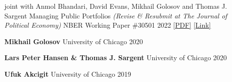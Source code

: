 


\begin{cventries}

	\cventry
	{joint with Anmol Bhandari, David Evans, Mikhail Golosov and Thomas J. Sargent} %
	{Managing Public Portfolios \textit{(Revise \& Resubmit at The Journal of Political Economy)}}  %
	{NBER Working Paper \#30501} %
	{2022} %
	{\href{https://static1.squarespace.com/static/54c19f18e4b0ef5f4b9f8dae/t/6328ee5213a65c43a48423f8/1663626851912/abegs4draft.pdf}{[PDF]} \href{https://www.nber.org/papers/w30501}{[Link]}}

\end{cventries}


\begin{cvhonors}
	\cvhonor
	{\textbf{Mikhail Golosov}} %
	{University of Chicago} %
	{} %
	{2020} %

	\cvhonor
	{\textbf{Lars Peter Hansen \& Thomas J. Sargent}} %
	{University of Chicago} %
	{} %
	{2020} %

	\cvhonor
	{\textbf{Ufuk Akcigit}} %
	{University of Chicago} %
	{} %
	{2019} %

\end{cvhonors}

